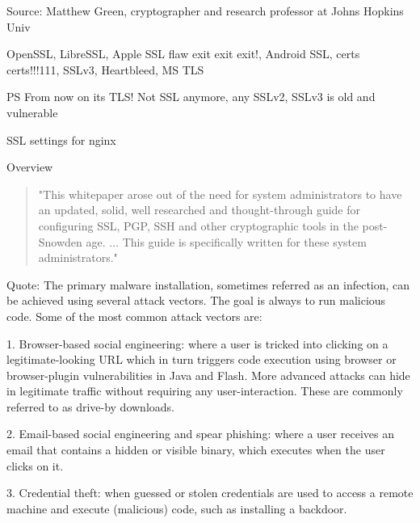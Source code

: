 \documentclass[20pt,landscape,a4paper]{foils}
\begin{document}
Source: Matthew Green, cryptographer and research professor at Johns Hopkins Univ\\
{\tiny{}
 
}


OpenSSL, LibreSSL, Apple SSL flaw exit exit exit!, Android SSL, certs certs!!!111, SSLv3, Heartbleed, MS TLS




\vskip 1cm
PS From now on its TLS! Not SSL anymore, any SSLv2, SSLv3 is old and vulnerable



SSL settings for nginx

Overview
\begin{quote}
"This whitepaper arose out of the need for system administrators to have an updated,
solid, well researched and thought-through guide for configuring SSL, PGP, SSH and
other cryptographic tools in the post-Snowden age. ... This guide is specifically
written for these system administrators."
\end{quote}



Quote:
The primary malware installation, sometimes referred as an infection, can be achieved using several attack vectors.
The goal is always to run malicious code. Some of the most common attack vectors are:

\begin{list2}
\item 1. Browser-based social engineering: where a user is tricked into clicking on a legitimate-looking URL which in turn triggers code execution using browser or browser-plugin vulnerabilities in Java and Flash. More advanced attacks can hide in legitimate traffic without requiring any user-interaction. These are commonly referred to as drive-by downloads.
\item 2. Email-based social engineering and spear phishing: where a user receives an email that contains a hidden or visible binary, which executes when the user clicks on it.
\item 3. Credential theft: when guessed or stolen credentials are used to access a remote machine and execute (malicious) code, such as installing a backdoor.
\end{list2}
\end{document}
